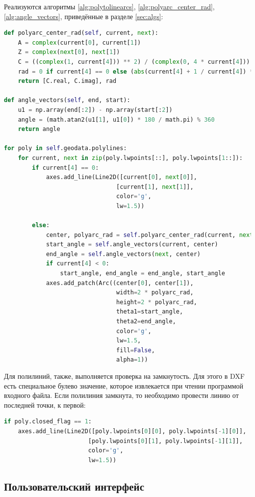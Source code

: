 Реализуются алгоритмы \ref{alg:polytolinearcs}, \ref{alg:polyarc_center_rad}, \ref{alg:angle_vectors}, приведённые в разделе \ref{sec:algs}:
\begin{lstlisting}[language=python,label=list:sketch]
def polyarc_center_rad(self, current, next):
	A = complex(current[0], current[1])
	Z = complex(next[0], next[1])
	C = ((complex(1, current[4])) ** 2) / (complex(0, 4 * current[4])) * A - ((complex(1, -current[4])) ** 2) / (complex(0, 4 * current[4])) * Z
	rad = 0 if current[4] == 0 else (abs(current[4] + 1 / current[4]) * math.sqrt((next[0] - current[0]) ** 2 + (next[1] - current[1]) ** 2) / 4)
	return [C.real, C.imag], rad

def angle_vectors(self, end, start):
	u1 = np.array(end[:2]) - np.array(start[:2])
	angle = (math.atan2(u1[1], u1[0]) * 180 / math.pi) % 360
	return angle

for poly in self.geodata.polylines:
	for current, next in zip(poly.lwpoints[::], poly.lwpoints[1::]):
		if current[4] == 0:
			axes.add_line(Line2D([current[0], next[0]],
								[current[1], next[1]],
								color='g',
								lw=1.5))

		else:
			center, polyarc_rad = self.polyarc_center_rad(current, next)
			start_angle = self.angle_vectors(current, center)
			end_angle = self.angle_vectors(next, center)
			if current[4] < 0:
				start_angle, end_angle = end_angle, start_angle
			axes.add_patch(Arc((center[0], center[1]),
								width=2 * polyarc_rad,
								height=2 * polyarc_rad,
								theta1=start_angle,
								theta2=end_angle,
								color='g',
								lw=1.5,
								fill=False,
								alpha=1))
\end{lstlisting}

Для полилиний, также, выполняется проверка на замкнутость.  Для этого в DXF есть специальное булево значение, которое извлекается при чтении программой входного файла. Если полилиния замкнута, то необходимо провести линию от последней точки, к первой:
\begin{lstlisting}[language=python,label=list:closedflag]
if poly.closed_flag == 1:
	axes.add_line(Line2D([poly.lwpoints[0][0], poly.lwpoints[-1][0]],
						[poly.lwpoints[0][1], poly.lwpoints[-1][1]],
						color='g',
						lw=1.5))
\end{lstlisting}

\subsection{Пользовательский интерфейс}

